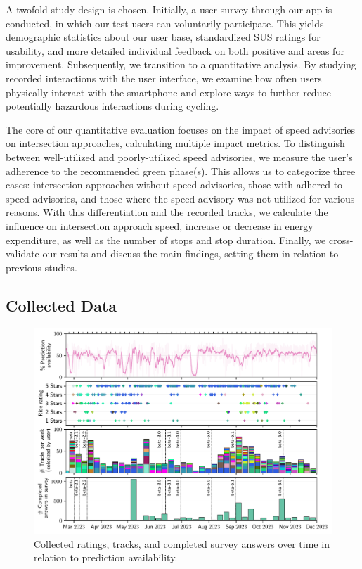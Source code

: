A twofold study design is chosen. Initially, a user survey through our app is conducted, in which our test users can voluntarily participate. This yields demographic statistics about our user base, standardized SUS ratings for usability, and more detailed individual feedback on both positive and areas for improvement. Subsequently, we transition to a quantitative analysis. By studying recorded interactions with the user interface, we examine how often users physically interact with the smartphone and explore ways to further reduce potentially hazardous interactions during cycling.

The core of our quantitative evaluation focuses on the impact of speed advisories on intersection approaches, calculating multiple impact metrics. To distinguish between well-utilized and poorly-utilized speed advisories, we measure the user's adherence to the recommended green phase(s). This allows us to categorize three cases: intersection approaches without speed advisories, those with adhered-to speed advisories, and those where the speed advisory was not utilized for various reasons. With this differentiation and the recorded tracks, we calculate the influence on intersection approach speed, increase or decrease in energy expenditure, as well as the number of stops and stop duration. Finally, we cross-validate our results and discuss the main findings, setting them in relation to previous studies.

\subsection{Collected Data}

\begin{figure}[t]
\caption{Collected ratings, tracks, and completed survey answers over time in relation to prediction availability.}\label{fig:app-usage-over-time}
\includegraphics[width=\linewidth]{images/app-usage-over-time.pdf}
\end{figure}

